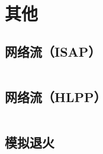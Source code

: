 \documentclass[a4paper,9]{article}
\begin{document}
\section{其他}
\subsection{网络流（ISAP）}
\inputminted[breaklines]{c++}{others/isap.cpp}
\subsection{网络流（HLPP）}
\inputminted[breaklines]{c++}{others/hlpp.cpp}
\subsection{模拟退火}
\inputminted[breaklines]{c++}{others/simulate_anneal.cpp}

\end{document}
